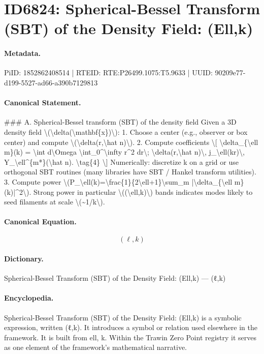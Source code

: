 \section*{ID6824: Spherical-Bessel Transform (SBT) of the Density Field: (Ell,k)}
\paragraph{Metadata.}
PiID: 1852862408514 | RTEID: RTE:P26499.1075:T5.9633 | UUID: 90209e77-d199-5527-ad66-a390b7129813

\paragraph{Canonical Statement.}
\#\#\# A. Spherical-Bessel transform (SBT) of the density field Given a 3D density field \textbackslash{}(\textbackslash{}delta(\textbackslash{}mathbf\{x\})\textbackslash{}): 1. Choose a center (e.g., observer or box center) and compute \textbackslash{}(\textbackslash{}delta(r,\textbackslash{}hat n)\textbackslash{}). 2. Compute coefficients \textbackslash{}[ \textbackslash{}delta\_\{\textbackslash{}ell m\}(k) = \textbackslash{}int d\textbackslash{}Omega \textbackslash{}int\_0\textasciicircum{}\textbackslash{}infty r\textasciicircum{}2 dr\textbackslash{}; \textbackslash{}delta(r,\textbackslash{}hat n)\textbackslash{}, j\_\textbackslash{}ell(kr)\textbackslash{}, Y\_\textbackslash{}ell\textasciicircum{}\{m*\}(\textbackslash{}hat n). \textbackslash{}tag\{4\} \textbackslash{}] Numerically: discretize k on a grid or use orthogonal SBT routines (many libraries have SBT / Hankel transform utilities). 3. Compute power \textbackslash{}(P\_\textbackslash{}ell(k)=\textbackslash{}frac\{1\}\{2\textbackslash{}ell+1\}\textbackslash{}sum\_m |\textbackslash{}delta\_\{\textbackslash{}ell m\}(k)|\textasciicircum{}2\textbackslash{}). Strong power in particular \textbackslash{}((\textbackslash{}ell,k)\textbackslash{}) bands indicates modes likely to seed filaments at scale \textbackslash{}(\textasciitilde{}1/k\textbackslash{}).

\paragraph{Canonical Equation.}
\[
(\ell,k)
\]

\paragraph{Dictionary.}
Spherical-Bessel Transform (SBT) of the Density Field: (Ell,k) — (ℓ,k)

\paragraph{Encyclopedia.}
Spherical-Bessel Transform (SBT) of the Density Field: (Ell,k) is a symbolic expression, written (ℓ,k). It introduces a symbol or relation used elsewhere in the framework. It is built from ell, k. Within the Trawin Zero Point registry it serves as one element of the framework's mathematical narrative.
